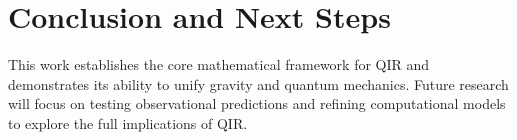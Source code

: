 \documentclass{article}
\begin{document}
\section{Conclusion and Next Steps}
This work establishes the core mathematical framework for QIR and demonstrates its ability to unify gravity and quantum mechanics. Future research will focus on testing observational predictions and refining computational models to explore the full implications of QIR.
\end{document}
